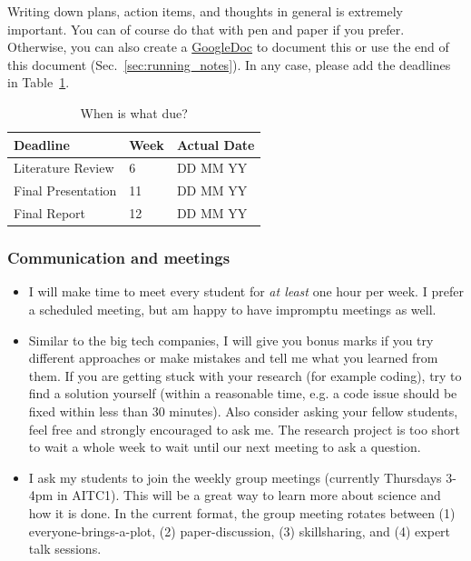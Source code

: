 \documentclass[fleqn,usenatbib]{mnras}
\begin{document}
Writing down plans, action items, and thoughts in general is extremely important. You can of course do that with pen and paper if you prefer. Otherwise, you can also create a \href{https://docs.google.com}{GoogleDoc} to document this or use the end of this document (Sec.~\ref{sec:running_notes}). In any case, please add the deadlines in Table~\ref{tab:deadlines}.

\begin{table}
	\centering
	\caption{When is what due?}
	\label{tab:deadlines}
	\begin{tabular}{lll} %
		\hline
		Deadline & Week & Actual Date \\
		\hline
		Literature Review     & 6 & DD MM YY\\
		Final Presentation    & 11 & DD MM YY\\
		Final Report          & 12 & DD MM YY\\
		\hline
	\end{tabular}
\end{table}

\subsubsection{Communication and meetings}

\begin{itemize}
    \item I will make time to meet every student for \textit{at least} one hour per week. I prefer a scheduled meeting, but am happy to have impromptu meetings as well.
    \item Similar to the big tech companies, I will give you bonus marks if you try different approaches or make mistakes and tell me what you learned from them. If you are getting stuck with your research (for example coding), try to find a solution yourself (within a reasonable time, e.g. a code issue should be fixed within less than 30 minutes). Also consider asking your fellow students, feel free and strongly encouraged to ask me. The research project is too short to wait a whole week to wait until our next meeting to ask a question. 
    \item I ask my students to join the weekly group meetings (currently Thursdays 3-4pm in AITC1). This will be a great way to learn more about science and how it is done. In the current format, the group meeting rotates between (1) everyone-brings-a-plot, (2) paper-discussion, (3) skillsharing, and (4) expert talk sessions.
\end{itemize}
\end{document}
